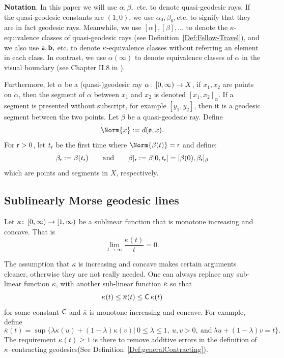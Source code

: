 \documentclass[12 pt]{amsart}
\newcommand{\bfa}{\textbf{a}}
\newcommand{\bfb}{\textbf{b}}
\newcommand{\gothic}{\mathfrak}
\newcommand{\go}{{\gothic o}}
\theoremstyle{definition}
\theoremstyle{remark}
\newcommand{\sC}{{\sf C}}
\renewcommand{\bfa}{{\sf a}}
\newcommand{\rr}{{\sf r}}
\newcommand{\ST}{\mathbin{\Big|}}
\newcommand{\from}{\colon\thinspace}
\begin{document}
\noindent \textbf{Notation}. In this paper we will use $\alpha, \beta,$ etc. to denote quasi-geodesic rays. If the quasi-geodesic constants are $(1, 0)$, we use $\alpha_{0}, \beta_{0},$etc. to signify that they are in fact geodesic rays.  Meanwhile, we use $[\alpha], [\beta],...$ to denote the $\kappa$-equivalence classes of quasi-geodesic rays (see Definition~\ref{Def:Fellow-Travel}), and we also use $\bfa, \bfb,$ etc. to denote $\kappa$-equivalence classes without referring an element in each class. In contrast, we use $\alpha(\infty)$ to denote equivalence classes of $\alpha$ in the visual boundary (see Chapter II.8 in \cite{BH1}). 


Furthermore, let $\alpha$ be a (quasi-)geodesic ray $\alpha \from [0, \infty) \to X$, if $x_{1}, x_{2}$ are points on $\alpha$, then the segment of $\alpha$ between $x_{1}$ and $x_{2}$
is denoted $[x_{1}, x_{2}]_{\alpha}$. If a segment is presented without subscript, for example $[y_{1}, y_{2}]$, then it is a geodesic segment between the two points.
Let $\beta$ be a quasi-geodesic ray. Define 
\[
\Norm{x} : = d(\go, x).
\]
For $\rr>0$, let $t_\rr$ be the first time where $\Norm{\beta(t)}=\rr$ and define:
\begin{equation}\label{notation}
\beta_\rr := \beta(t_\rr)
\qquad\text{and}\qquad
\beta|_{\rr} : = \beta{[0,t_\rr]} = [\beta(0),  \beta_{\rr}]_{\beta}
\end{equation}
which are points and segments in $X$, respectively. 

\subsection{Sublinearly Morse geodesic lines} \hfill




Let $\kappa \from [0, \infty) \to [1, \infty)$ be a sublinear function that is monotone increasing and concave. That is
\[
\lim_{t \to \infty} \frac{\kappa(t)}{t} = 0. \label{subfunction}
\]

The assumption that $\kappa$ is increasing and concave makes certain arguments
cleaner, otherwise they are not really needed. One can always replace any 
sub-linear function $\kappa$, with another sub-linear function $\overline \kappa$
so that \[\kappa(t) \leq \overline \kappa(t) \leq \sC \, \kappa(t)\] for some constant $\sC$ 
and $\overline \kappa$ is monotone increasing and concave. For example, define 
\[
\overline \kappa(t) = \sup \Big\{ \lambda \kappa(u) + (1-\lambda) \kappa(v) \ST 
\ 0 \leq \lambda \leq 1, \ u, v>0, \ \text{and}\ \lambda u + (1-\lambda)v =t \Big\}.
\]
The requirement $\kappa(t) \geq 1$ is there to remove additive errors in the definition
of $\kappa$--contracting geodesics(See Definition~\ref{Def:generalContracting}). 
\end{document}
